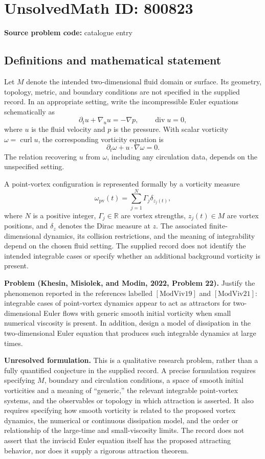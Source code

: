 \documentclass[11pt]{article}
\newcommand{\R}{\mathbb{R}}
\begin{document}
\section*{UnsolvedMath ID: 800823}
\textbf{Source problem code:} catalogue entry
\subsection{Definitions and mathematical statement}
Let \(M\) denote the intended two-dimensional fluid domain or surface. Its geometry, topology, metric, and boundary conditions are not specified in the supplied record. In an appropriate setting, write the incompressible Euler equations schematically as
\[
\partial_t u+\nabla_u u=-\nabla p,\qquad \operatorname{div}u=0,
\]
where \(u\) is the fluid velocity and \(p\) is the pressure. With scalar vorticity \(\omega=\operatorname{curl}u\), the corresponding vorticity equation is
\[
\partial_t\omega+u\cdot\nabla\omega=0.
\]
The relation recovering \(u\) from \(\omega\), including any circulation data, depends on the unspecified setting.

A point-vortex configuration is represented formally by a vorticity measure
\[
\omega_{\mathrm{pv}}(t)=\sum_{j=1}^{N}\Gamma_j\delta_{z_j(t)},
\]
where \(N\) is a positive integer, \(\Gamma_j\in\R\) are vortex strengths, \(z_j(t)\in M\) are vortex positions, and \(\delta_z\) denotes the Dirac measure at \(z\). The associated finite-dimensional dynamics, its collision restrictions, and the meaning of integrability depend on the chosen fluid setting. The supplied record does not identify the intended integrable cases or specify whether an additional background vorticity is present.

\textbf{Problem (Khesin, Misiolek, and Modin, 2022, Problem 22).} Justify the phenomenon reported in the references labelled \([\mathrm{ModViv19}]\) and \([\mathrm{ModViv21}]\): integrable cases of point-vortex dynamics appear to act as attractors for two-dimensional Euler flows with generic smooth initial vorticity when small numerical viscosity is present. In addition, design a model of dissipation in the two-dimensional Euler equation that produces such integrable dynamics at large times.

\textbf{Unresolved formulation.} This is a qualitative research problem, rather than a fully quantified conjecture in the supplied record. A precise formulation requires specifying \(M\), boundary and circulation conditions, a space of smooth initial vorticities and a meaning of ``generic,'' the relevant integrable point-vortex systems, and the observables or topology in which attraction is asserted. It also requires specifying how smooth vorticity is related to the proposed vortex dynamics, the numerical or continuous dissipation model, and the order or relationship of the large-time and small-viscosity limits. The record does not assert that the inviscid Euler equation itself has the proposed attracting behavior, nor does it supply a rigorous attraction theorem.
\end{document}
